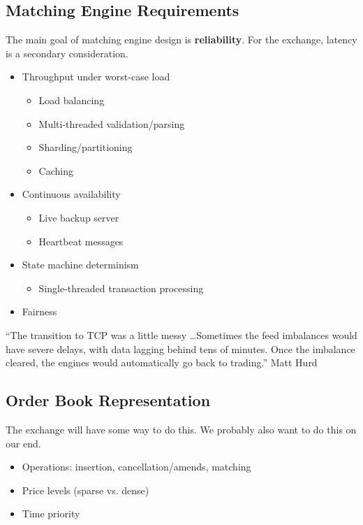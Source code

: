 \documentclass{article}
\begin{document}
\subsection{Matching Engine Requirements}
The main goal of matching engine design is \textbf{reliability}. For the exchange, latency is a secondary consideration.
\begin{itemize}
	\item Throughput under worst-case load
	\begin{itemize}
		\item Load balancing
		\item Multi-threaded validation/parsing
		\item Sharding/partitioning %
		\item Caching
	\end{itemize}
	\item Continuous availability
	\begin{itemize}
		\item Live backup server
		\item Heartbeat messages
	\end{itemize}
	\item State machine determinism
	\begin{itemize}
		\item Single-threaded transaction processing
	\end{itemize}
	\item Fairness
\end{itemize}
\begin{block}{}
	``The transition to TCP was a little messy \ldots Sometimes the feed imbalances would have severe delays, with data lagging behind tens of minutes. Once the imbalance cleared, the engines would automatically go back to trading.'' Matt Hurd
\end{block}

\subsection{Order Book Representation}
The exchange will have some way to do this. We probably also want to do this on our end.
\begin{itemize}
	\item Operations: insertion, cancellation/amends, matching
	\item Price levels (sparse vs. dense)
	\item Time priority
\end{itemize}
\end{document}
